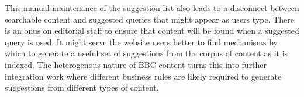 This manual maintenance of the suggestion list also leads to a
disconnect between searchable content and suggested queries that might
appear as users type. There is an onus on editorial staff to ensure
that content will be found when a suggested query is used. It might
serve the website users better to find mechanisms by which to generate
a useful set of suggestions from the corpus of content as it is
indexed. The heterogenous nature of BBC content turns this into
further integration work where different business rules are likely required
to generate suggestions from different types of content.
